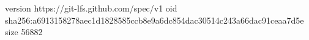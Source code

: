 version https://git-lfs.github.com/spec/v1
oid sha256:a6913158278aec1d1828585ccb8e9a6dc854dac30514c243a66dac91ceaa7d5e
size 56882
